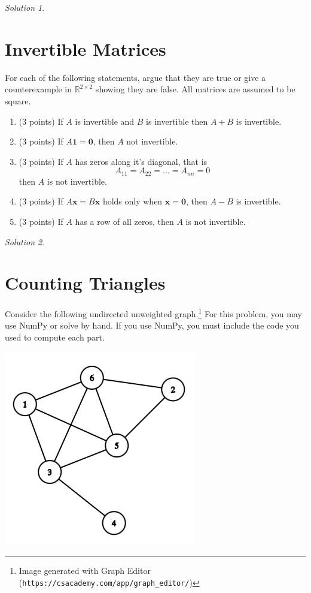 \documentclass{article}
\theoremstyle{remark}
\newtheorem*{solution}{Solution}
\begin{document}
\medskip

\begin{solution}
\end{solution}

\pagebreak
\section{Invertible Matrices}

For each of the following statements, argue that they are true or give a counterexample in $\mathbb R^{2 \times 2}$ showing they are false.
All matrices are assumed to be square.

\begin{enumerate}
\item (3 points) If $A$ is invertible and $B$ is invertible then $A + B$ is invertible.
\item (3 points) If $A\mathbf 1 = \mathbf 0$, then $A$ not invertible.
\item (3 points) If $A$ has zeros along it's diagonal, that is
  \begin{displaymath}
    A_{11} = A_{22} = \dots = A_{nn} = 0
  \end{displaymath}
  then $A$ is not invertible.
\item (3 points) If $A \mathbf x = B \mathbf x$ holds only when $\mathbf x = \mathbf{0}$, then $A - B$ is invertible.
\item (3 points) If $A$ has a row of all zeros, then $A$ is not invertible.
\end{enumerate}

\medskip

\begin{solution}
\end{solution}

\pagebreak
\section{Counting Triangles}

Consider the following undirected unweighted graph.\footnote{Image generated with Graph Editor (\texttt{https://csacademy.com/app/graph\_editor/})}
For this problem, you may use NumPy or solve by hand.
If you use NumPy, you must include the code you used to compute each part.
\begin{center}
  \includegraphics[scale=0.4]{graph.png}
\end{center}
\end{document}
